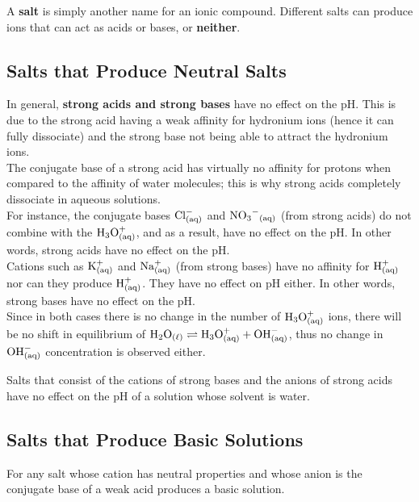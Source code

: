 A \textbf{salt} is simply another name for an ionic compound. Different salts can produce ions that
can act as acids or bases, or \textbf{neither}.

\subsection{Salts that Produce Neutral Salts}
In general, \textbf{strong acids and strong bases} have no effect on the pH. This is due
to the strong acid having a weak affinity for hydronium ions (hence it can fully dissociate)
and the strong base not being able to attract the hydronium ions.\\

The conjugate base of a strong acid has virtually no affinity for protons when compared to the
affinity of water molecules; this is why strong acids completely dissociate in aqueous solutions.\\

For instance, the conjugate bases $\ch{Cl^-_{(aq)}}$ and $\ch{NO3^-_{(aq)}}$ (from strong acids) 
do not combine with the $\ch{H3O^+_{(aq)}}$, and as a result, have no effect on the pH.
In other words, strong acids have no effect on the pH.\\

Cations such as $\ch{K^+_{(aq)}}$ and $\ch{Na^+_{(aq)}}$ (from strong bases) have no affinity
for $\ch{H^+_{(aq)}}$ nor can they produce $\ch{H^+_{(aq)}}$. They have no effect on pH either.
In other words, strong bases have no effect on the pH.\\

Since in both cases there is no change in the number of $\ch{H3O^+_{(aq)}}$ ions, there will
be no shift in equilibrium of $\ch{H2O_{(\ell)}}\rightleftharpoons \ch{H3O^+_{(aq)}}+\ch{OH^-_{(aq)}}$,
thus no change in $\ch{OH^-_{(aq)}}$ concentration is observed either.

\begin{important}
    Salts that consist of the cations of strong bases and the anions of strong acids have no 
    effect on the pH of a solution whose solvent is water.
\end{important}

\subsection{Salts that Produce Basic Solutions}
For any salt whose cation has neutral properties and whose anion is the conjugate base of a weak
acid produces a basic solution.\\


